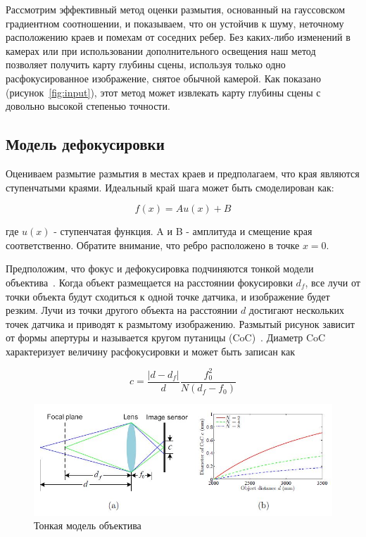 Рассмотрим эффективный метод оценки размытия, основанный на гауссовском градиентном соотношении, и показываем, что он устойчив к шуму, неточному расположению краев и помехам от соседних ребер. Без каких-либо изменений в камерах или при использовании дополнительного освещения наш метод позволяет получить карту глубины сцены, используя только одно расфокусированное изображение, снятое обычной камерой. Как показано (рисунок~\ref{fig:input}), этот метод может извлекать карту глубины сцены с довольно высокой степенью точности.

\subsection{Модель дефокусировки}

Оцениваем размытие размытия в местах краев и предполагаем, что края являются ступенчатыми краями. Идеальный край шага может быть смоделирован как:

\begin{equation}\label{eq:1}
f(x)=Au(x)+B
\end{equation}

где $u(x)$ - ступенчатая функция. A и B - амплитуда и смещение края соответственно. Обратите внимание, что ребро расположено в точке $x=0$.

Предположим, что фокус и дефокусировка подчиняются тонкой модели объектива~\cite{Optics}. Когда объект размещается на расстоянии фокусировки $d_f$, все лучи от точки объекта будут сходиться к одной точке датчика, и изображение будет резким. Лучи из точки другого объекта на расстоянии $d$ достигают нескольких точек датчика и приводят к размытому изображению. Размытый рисунок зависит от формы апертуры и называется кругом путаницы (CoC)~\cite{Optics}. Диаметр CoC характеризует величину расфокусировки и может быть записан как

\begin{equation}\label{eq:2}
c=\frac{|d-d_f|}{d}\frac{f_0^2}{N(d_f-f_0)}
\end{equation}

\begin{figure}[H]
	\centering
	\includegraphics[width=1\linewidth]{pics/focus}
	\caption{Тонкая модель объектива}
	\label{fig:focus}
\end{figure}

